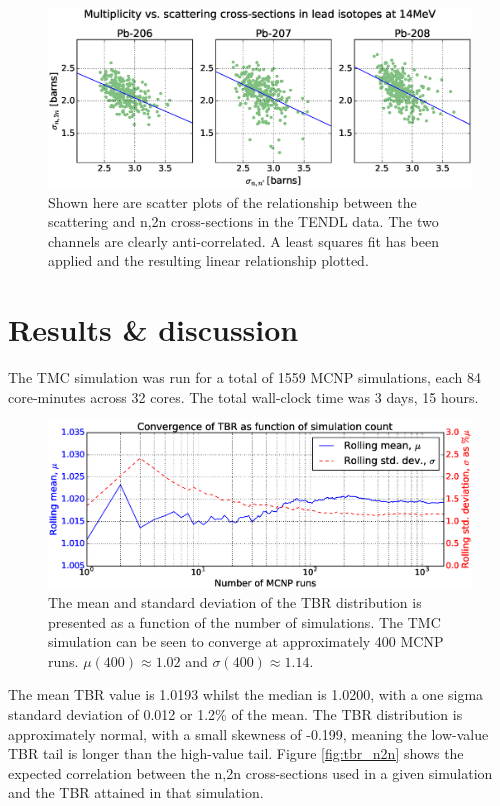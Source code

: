 \begin{figure}[ht]
	\includegraphics[width=\textwidth]{pb_el_n2n_corr}
  \caption{Shown here are scatter plots of the relationship between the scattering and n,2n cross-sections in the TENDL data. The two channels are clearly anti-correlated. A least squares fit has been applied and the resulting linear relationship plotted.}
	\label{fig:pb_el_n2n_corr}
\end{figure}

\section{Results \& discussion}

The TMC simulation was run for a total of 1559 MCNP simulations, each 84 core-minutes across 32 cores. The total wall-clock time was 3 days, 15 hours.

\begin{figure}[ht]
	\includegraphics[width=\textwidth]{hcll_convergence_1559}
	\caption{The mean and standard deviation of the TBR distribution is presented as a function of the number of simulations. The TMC simulation can be seen to converge at approximately 400 MCNP runs. $\mu(400) \approx 1.02$ and $\sigma(400) \approx 1.14$.}
	\label{fig:convergence}
\end{figure}

The mean TBR value is 1.0193 whilst the median is 1.0200, with a one sigma standard deviation of 0.012 or 1.2\% of the mean. The TBR distribution is approximately normal, with a small skewness of -0.199, meaning the low-value TBR tail is longer than the high-value tail. Figure \ref{fig:tbr_n2n} shows the expected correlation between the n,2n cross-sections used in a given simulation and the TBR attained in that simulation.


